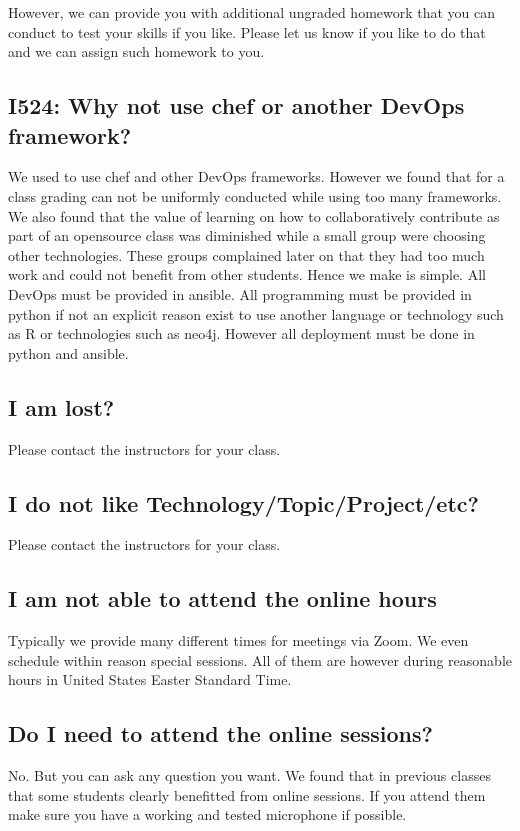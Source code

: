 However, we can provide you with additional ungraded homework that you
can conduct to test your skills if you like. Please let us know if you
like to do that and we can assign such homework to you.


\subsection{I524: Why not use chef or another DevOps framework?}
\label{\detokenize{faq:i524-why-not-use-chef-or-another-devops-framework}}
We used to use chef and other DevOps frameworks. However we found that
for a class grading can not be uniformly conducted while using too
many frameworks. We also found that the value of learning on how to
collaboratively contribute as part of an opensource class was
diminished while a small group were choosing other technologies. These
groups complained later on that they had too much work and could not
benefit from other students. Hence we make is simple. All DevOps must
be provided in ansible. All programming must be provided in python if
not an explicit reason exist to use another language or technology
such as R or technologies such as neo4j. However all deployment must
be done in python and ansible.


\subsection{I am lost?}
\label{\detokenize{faq:i-am-lost}}
Please contact the instructors for your class.


\subsection{I do not like Technology/Topic/Project/etc?}
\label{\detokenize{faq:i-do-not-like-technology-topic-project-etc}}
Please contact the instructors for your class.


\subsection{I am not able to attend the online hours}
\label{\detokenize{faq:i-am-not-able-to-attend-the-online-hours}}
Typically we provide many different times for meetings via Zoom. We
even schedule within reason special sessions. All of them are however
during reasonable hours in United States Easter Standard Time.


\subsection{Do I need to attend the online sessions?}
\label{\detokenize{faq:do-i-need-to-attend-the-online-sessions}}
No. But you can ask any question you want. We found that in previous
classes that some students clearly benefitted from online sessions.
If you attend them make sure you have a working and tested microphone
if possible.


